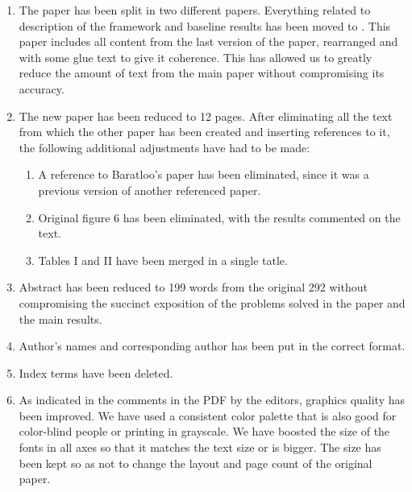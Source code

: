 \documentclass[preprint]{elsarticle}
\begin{document}
\begin{enumerate}
\item The paper has been split in two different papers. Everything
  related to description of the framework and baseline results has
  been moved to \cite{2016arXiv160101607M}. This paper includes all
  content from the last version of the paper, rearranged and with some
  glue text to give it coherence. This has allowed us to greatly
  reduce the amount of text from the main paper without compromising
  its accuracy.
\item The new paper has been reduced to 12 pages. After eliminating
  all the text from which the other paper has been created and
  inserting references to it, the following additional adjustments
  have had to be made:\begin{enumerate}
  \item A reference to Baratloo's paper has been eliminated, since it
    was a previous version of another referenced paper.
  \item Original figure 6 has been eliminated, with the results
    commented on the text.
  \item Tables I and II have been merged in a single tatle.
  \end{enumerate}
\item Abstract has been reduced to 199 words from the original 292
  without compromising the succinct exposition of the problems solved
  in the paper and the main results.
\item Author's names and corresponding author has been put in the
  correct format.
\item Index terms have been deleted.
\item As indicated in the comments in the PDF by the editors, graphics
  quality has been improved. We have used a consistent color palette
  that is also good for color-blind people or printing in
  grayscale. We have boosted the size of the fonts in all axes so that
  it matches the text size or is bigger. The size has been kept so as
  not to change the layout and page count of the original paper.
\end{enumerate}




\end{document}
